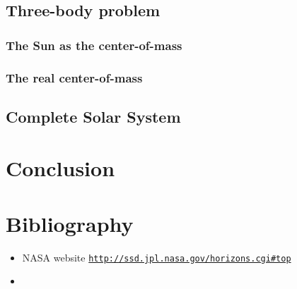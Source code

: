 \documentclass[a4paper, twoside, 11pt]{report}
\theoremstyle{theorem}
\theoremstyle{remark}
\theoremstyle{exemple}
\begin{document}
    
    \section{Three-body problem}
        \subsection{The Sun as the center-of-mass}
        
        \subsection{The real center-of-mass}
    
    
    \section{Complete Solar System}
        \subsection{}
        
        \subsection{}
    
    

\chapter*{Conclusion}

    \paragraph{}
    
    
    
    
\chapter*{Bibliography}
    \begin{itemize}
        \item NASA website \href{{http://ssd.jpl.nasa.gov/horizons.cgi#top}}{\nolinkurl{http://ssd.jpl.nasa.gov/horizons.cgi\#top}}
        \item 
    \end{itemize}
    
    
    
    
    
    
    
    
    
    
\end{document}
